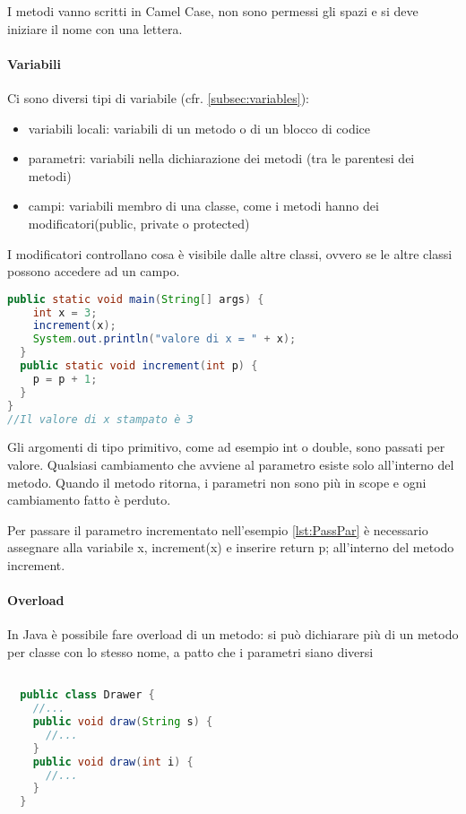 \documentclass[a4paper,12pt,twoside]{book}
\begin{document}
I metodi vanno scritti in Camel Case, non sono permessi gli spazi e si
deve iniziare il nome con una lettera.

\paragraph{Variabili}

Ci sono diversi tipi di variabile (cfr. \ref{subsec:variables}):


\begin{itemize}
\item variabili locali: variabili di un metodo o di un blocco di codice
\item parametri: variabili nella dichiarazione dei metodi (tra le
  parentesi dei metodi)
\item campi: variabili membro di una classe, come i metodi hanno dei
  modificatori(public,  private o protected)
\end{itemize}

I modificatori controllano cosa è visibile dalle altre classi, ovvero
se le altre classi possono accedere ad un campo.

\begin{lstlisting}[caption={Passaggio di parametri}, label={lst:PassPar},
  language=Java]
  public static void main(String[] args) {
    int x = 3;
    increment(x);
    System.out.println("valore di x = " + x);
  }
  public static void increment(int p) {
    p = p + 1;
  }
}
//Il valore di x stampato è 3
\end{lstlisting}

Gli argomenti di tipo primitivo, come ad esempio int o double, sono
passati per valore. Qualsiasi cambiamento che avviene al parametro
esiste solo all’interno del metodo. Quando il metodo ritorna, i
parametri non sono più in scope e ogni cambiamento fatto è perduto.

Per passare il parametro incrementato nell'esempio \ref{lst:PassPar} è
necessario assegnare alla variabile x, increment(x) e inserire return
p; all'interno del metodo increment.

\paragraph{Overload}

In Java è possibile fare overload di un metodo: si può dichiarare più
di un metodo per classe con lo stesso nome, a patto che i parametri
siano diversi

\begin{lstlisting}[caption={Overload}, label={lst:Overload},
  language=Java]

  public class Drawer {
    //...
    public void draw(String s) {
      //...
    }
    public void draw(int i) {
      //...
    }
  }
\end{lstlisting}
\end{document}
